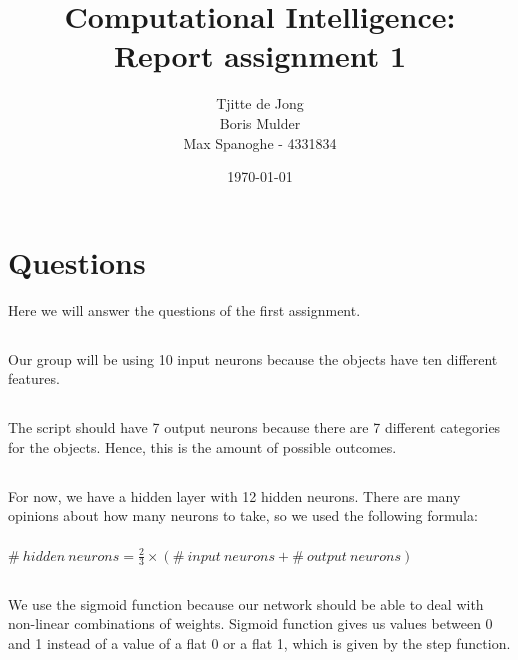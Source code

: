 \documentclass{scrartcl}
\begin{document}
\title{Computational Intelligence:
\\Report assignment 1}
\date{\today{}}

\author{
    \begin{tabular}{l r}
    	\\Tjitte de Jong
	\\Boris Mulder
        \\Max Spanoghe - 4331834
            \end{tabular}
  }
  
  \maketitle \thispagestyle{empty} \pagebreak
  
  \section{Questions}
  Here we will answer the questions of the first assignment.
  
  \subsection{}
  Our group will be using 10 input neurons because the objects have ten different features.
  
  \subsection{}
  The script should have 7 output neurons because there are 7 different categories for the objects.
  Hence, this is the amount of possible outcomes.
  
  \subsection{}
  For now, we have a hidden layer with 12 hidden neurons. There are many opinions about how many neurons to take, so we used the following formula: \\ \\ $\# \:hidden \:neurons = \frac{2} {3} \times (\# \:input \:neurons + \# \:output \:neurons) $
  
  \subsection{}
  We use the sigmoid function because our network should be able to deal with non-linear combinations of weights. Sigmoid function gives us values between 0 and 1 instead of a value of a flat 0 or a flat 1, which is given by the step function.
  
\end{document}
